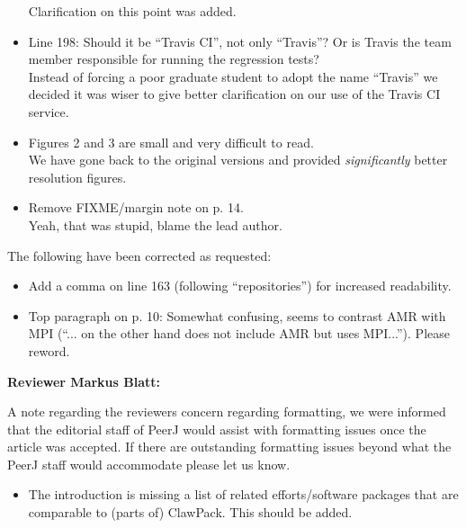 \documentclass{letter}
\begin{document}
\begin{letter}
\begin{itemize}
    Clarification on this point was added. \\

    \item Line 198: Should it be ``Travis CI'', not only ``Travis''? Or is
    Travis the team member responsible for running the regression tests? \\

    Instead of forcing a poor graduate student to adopt the name ``Travis'' we
    decided it was wiser to give better clarification on our use of the Travis
    CI service. \\

    \item Figures 2 and 3 are small and very difficult to read. \\

    We have gone back to the original versions and provided \emph{significantly}
    better resolution figures. \\

    \item Remove FIXME/margin note on p. 14. \\

    Yeah, that was stupid, blame the lead author.
\end{itemize}

The following have been corrected as requested:
\begin{itemize}
    \item Add a comma on line 163 (following ``repositories'') for increased
    readability.

    \item Top paragraph on p. 10: Somewhat confusing, seems to contrast AMR with
    MPI (``... on the other hand does not include AMR but uses MPI...''). Please
    reword.
\end{itemize}


\textbf{\large Reviewer Markus Blatt:}

A note regarding the reviewers concern regarding formatting, we were informed
that the editorial staff of PeerJ would assist with formatting issues once the
article was accepted.  If there are outstanding formatting issues beyond what
the PeerJ staff would accommodate please let us know.

\begin{itemize}
    \item The introduction is missing a list of related efforts/software
    packages that are comparable to (parts of) ClawPack. This should be
    added. \\


\end{itemize}
\end{letter}
\end{document}
